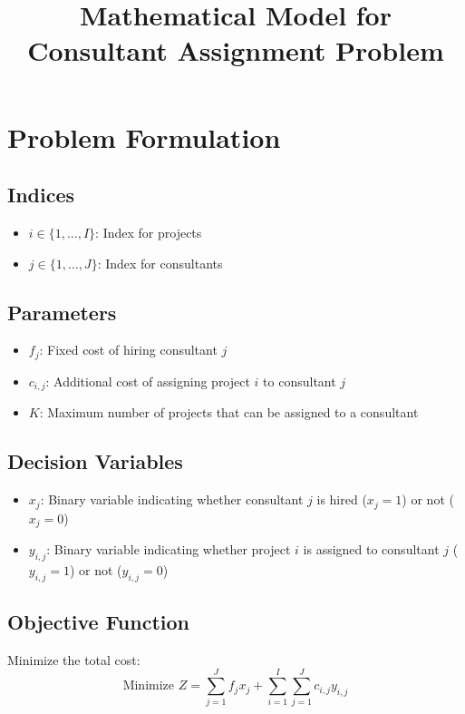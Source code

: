 \documentclass{article}
\begin{document}
\title{Mathematical Model for Consultant Assignment Problem}
\author{}
\date{}
\maketitle

\section*{Problem Formulation}

\subsection*{Indices}
\begin{itemize}
    \item $i \in \{1, \ldots, I\}$: Index for projects
    \item $j \in \{1, \ldots, J\}$: Index for consultants
\end{itemize}

\subsection*{Parameters}
\begin{itemize}
    \item $f_j$: Fixed cost of hiring consultant $j$
    \item $c_{i,j}$: Additional cost of assigning project $i$ to consultant $j$
    \item $K$: Maximum number of projects that can be assigned to a consultant
\end{itemize}

\subsection*{Decision Variables}
\begin{itemize}
    \item $x_{j}$: Binary variable indicating whether consultant $j$ is hired ($x_{j} = 1$) or not ($x_{j} = 0$)
    \item $y_{i,j}$: Binary variable indicating whether project $i$ is assigned to consultant $j$ ($y_{i,j} = 1$) or not ($y_{i,j} = 0$)
\end{itemize}

\subsection*{Objective Function}
Minimize the total cost:
\[
\text{Minimize } Z = \sum_{j=1}^{J} f_j x_j + \sum_{i=1}^{I} \sum_{j=1}^{J} c_{i,j} y_{i,j}
\]
\end{document}
